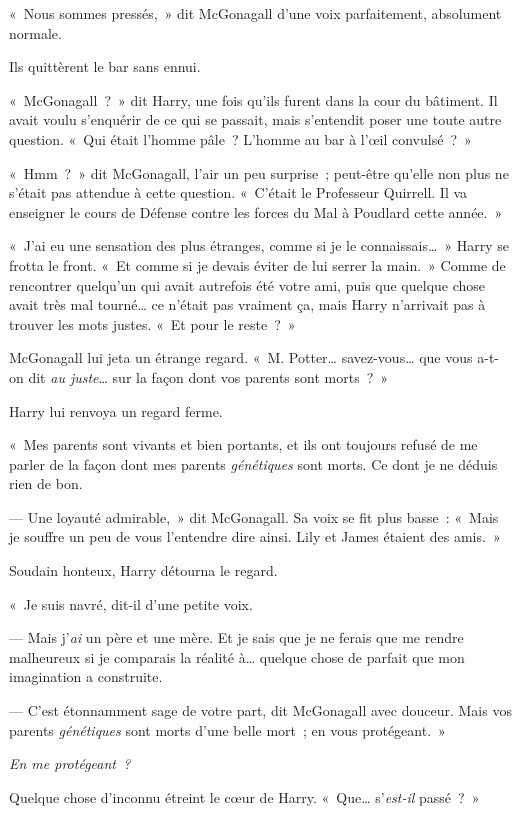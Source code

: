 «~Nous sommes pressés,~» dit McGonagall d'une voix parfaitement, absolument normale.

Ils quittèrent le bar sans ennui.

«~McGonagall~?~» dit Harry, une fois qu'ils furent dans la cour du bâtiment. Il avait voulu s'enquérir de ce qui se passait, mais s'entendit poser une toute autre question. «~Qui était l'homme pâle~? L'homme au bar à l'œil convulsé~?~»

«~Hmm~?~» dit McGonagall, l'air un peu surprise~; peut-être qu'elle non plus ne s'était pas attendue à cette question. «~C'était le Professeur Quirrell. Il va enseigner le cours de Défense contre les forces du Mal à Poudlard cette année.~»

«~J'ai eu une sensation des plus étranges, comme si je le connaissais…~» Harry se frotta le front. «~Et comme si je devais éviter de lui serrer la main.~» Comme de rencontrer quelqu'un qui avait autrefois été votre ami, puis que quelque chose avait très mal tourné… ce n'était pas vraiment ça, mais Harry n'arrivait pas à trouver les mots justes. «~Et pour le reste~?~»

McGonagall lui jeta un étrange regard. «~M. Potter… savez-vous… que vous a-t-on dit \emph{au juste}… sur la façon dont vos parents sont morts~?~»

Harry lui renvoya un regard ferme.

«~Mes parents sont vivants et bien portants, et ils ont toujours refusé de me parler de la façon dont mes parents \emph{génétiques} sont morts. Ce dont je ne déduis rien de bon.

--- Une loyauté admirable,~» dit McGonagall. Sa voix se fit plus basse~: «~Mais je souffre un peu de vous l'entendre dire ainsi. Lily et James étaient des amis.~»

Soudain honteux, Harry détourna le regard.

«~Je suis navré, dit-il d'une petite voix.

--- Mais j'\emph{ai} un père et une mère. Et je sais que je ne ferais que me rendre malheureux si je comparais la réalité à… quelque chose de parfait que mon imagination a construite.

--- C'est étonnamment sage de votre part, dit McGonagall avec douceur. Mais vos parents \emph{génétiques} sont morts d'une belle mort~; en vous protégeant.~»

\emph{En me protégeant~?}

Quelque chose d'inconnu étreint le cœur de Harry. «~Que… s'\emph{est-il} passé~?~»

